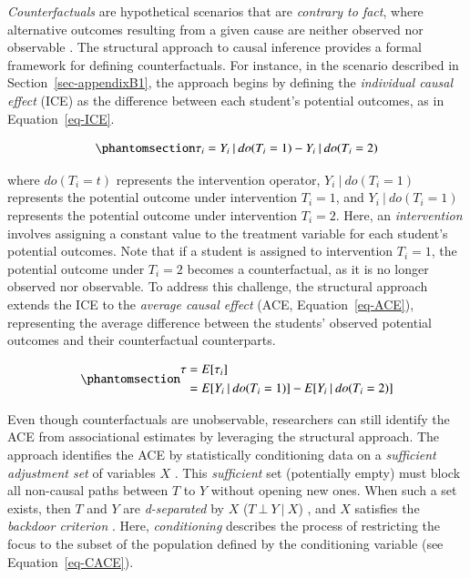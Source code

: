 \documentclass[
  authoryear,
  review,
  1p]{elsarticle}
\begin{document}
\emph{Counterfactuals} are hypothetical scenarios that are
\emph{contrary to fact}, where alternative outcomes resulting from a
given cause are neither observed nor observable
\citep{Neal_2020, Counterfactual_2024}. The structural approach to
causal inference \citep{Pearl_2009, Pearl_et_al_2016} provides a formal
framework for defining counterfactuals. For instance, in the scenario
described in Section~\ref{sec-appendixB1}, the approach begins by
defining the \emph{individual causal effect} (ICE) as the difference
between each student's potential outcomes, as in Equation~\ref{eq-ICE}.

\begin{equation}\phantomsection\label{eq-ICE}{
\tau_{i} = Y_{i} \:|\:do(T_{i}=1) - Y_{i} \:|\:do(T_{i}=2)
}\end{equation}

where \(do(T_{i}=t)\) represents the intervention operator,
\(Y_{i} \:|\:do(T_{i}=1)\) represents the potential outcome under
intervention \(T_{i}=1\), and \(Y_{i} \:|\:do(T_{i}=1)\) represents the
potential outcome under intervention \(T_{i}=2\). Here, an
\emph{intervention} involves assigning a constant value to the treatment
variable for each student's potential outcomes. Note that if a student
is assigned to intervention \(T_{i}=1\), the potential outcome under
\(T_{i}=2\) becomes a counterfactual, as it is no longer observed nor
observable. To address this challenge, the structural approach extends
the ICE to the \emph{average causal effect} (ACE,
Equation~\ref{eq-ACE}), representing the average difference between the
students' observed potential outcomes and their counterfactual
counterparts.

\begin{equation}\phantomsection\label{eq-ACE}{
\begin{aligned}
\tau & = E[\tau_{i}] \\
  & = E[Y_{i} \:|\:do(T_{i}=1)]- E[Y_{i} \:|\:do(T_{i}=2)]
\end{aligned}
}\end{equation}

Even though counterfactuals are unobservable, researchers can still
identify the ACE from associational estimates by leveraging the
structural approach. The approach identifies the ACE by statistically
conditioning data on a \emph{sufficient adjustment set} of variables
\(X\) \citep{Pearl_2009, Pearl_et_al_2016, Morgan_et_al_2014}. This
\emph{sufficient} set (potentially empty) must block all non-causal
paths between \(T\) to \(Y\) without opening new ones. When such a set
exists, then \(T\) and \(Y\) are \emph{d-separated} by \(X\)
(\(T \:\bot\:Y \:|\:X\)) \citep{Pearl_2009}, and \(X\) satisfies the
\emph{backdoor criterion} \citep[pp 37]{Neal_2020}. Here,
\emph{conditioning} describes the process of restricting the focus to
the subset of the population defined by the conditioning variable
\citep[pp.~32]{Neal_2020} (see Equation~\ref{eq-CACE}).
\end{document}
